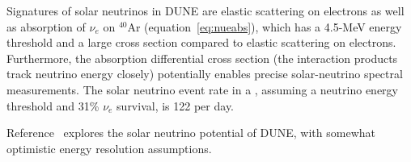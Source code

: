 Signatures of solar neutrinos in DUNE
are elastic scattering on electrons as well as  absorption of $\nu_e$ on $^{40}$Ar (equation~\ref{eq:nueabs}), which has a 4.5-MeV energy threshold and a large cross section compared to elastic scattering on electrons.  Furthermore, the  absorption differential cross section (the interaction products track neutrino energy closely) potentially enables precise solar-neutrino spectral measurements.
The solar neutrino event rate in a
 , assuming a  neutrino energy
threshold and 31\% $\nu_e$ survival, is 122 per day.

Reference~\cite{Capozzi:2018dat} explores the solar neutrino potential
of DUNE, with somewhat optimistic energy resolution assumptions.






